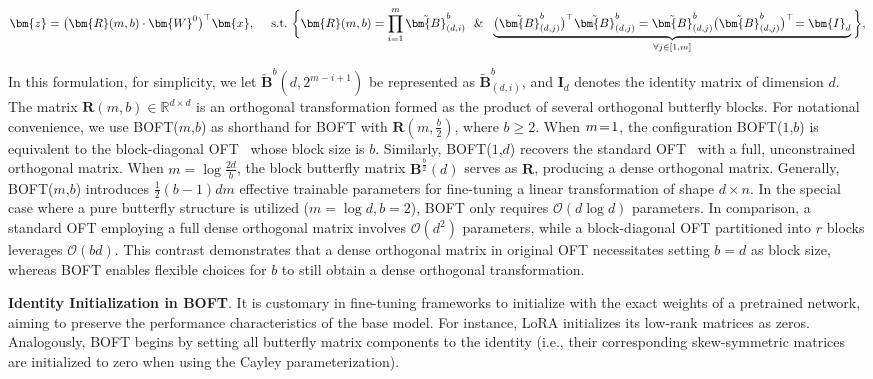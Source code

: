 \begin{equation}
    \begin{aligned}\nonumber
    \bm{z}=\big(\bm{R}(m,b)\cdot\bm{W}^0\big)^\top\bm{x},~~~~\text{s.t.}~\bigg{\{}\bm{R}(m,b)=\prod_{i=1}^m \tilde{\bm{B}}^b_{(d,i)}~~\&~~\underbrace{\big(\tilde{\bm{B}}^b_{(d,j)}\big)^\top\tilde{\bm{B}}^b_{(d,j)}=\tilde{\bm{B}}^b_{(d,j)}\big(\tilde{\bm{B}}^b_{(d,j)}\big)^\top\!=\bm{I}_d}_{\forall j\in [1, m]}\bigg{\}},
    \end{aligned}
\end{equation}

In this formulation, for simplicity, we let $\tilde{\bm{B}}^b(d,2^{m - i+1})$ be represented as $\tilde{\bm{B}}^b_{(d,i)}$, and $\bm{I}_d$ denotes the identity matrix of dimension $d$. The matrix $\bm{R}(m,b)\in\mathbb{R}^{d\times d}$ is an orthogonal transformation formed as the product of several orthogonal butterfly blocks. For notational convenience, we use BOFT($m$,$b$) as shorthand for BOFT with $\bm{R}(m,\frac{b}{2})$, where $b\geq 2$. When $\thickmuskip=2mu \medmuskip=2mu m=1$, the configuration BOFT($1$,$b$) is equivalent to the block-diagonal OFT~\cite{qiu2023controlling} whose block size is $b$. Similarly, BOFT($1$,$d$) recovers the standard OFT~\cite{qiu2023controlling} with a full, unconstrained orthogonal matrix. When $m=\log \frac{2d}{b}$, the block butterfly matrix $\bm{B}^{\frac{b}{2}}(d)$ serves as $\bm{R}$, producing a dense orthogonal matrix. Generally, BOFT($m$,$b$) introduces $\frac{1}{2}(b-1)dm$ effective trainable parameters for fine-tuning a linear transformation of shape $d\times n$. In the special case where a pure butterfly structure is utilized ($m=\log d, b=2$), BOFT only requires $\mathcal{O}(d\log d)$ parameters. In comparison, a standard OFT employing a full dense orthogonal matrix involves $\mathcal{O}(d^2)$ parameters, while a block-diagonal OFT partitioned into $r$ blocks leverages $\mathcal{O}(bd)$. This contrast demonstrates that a dense orthogonal matrix in original OFT necessitates setting $b=d$ as block size, whereas BOFT enables flexible choices for $b$ to still obtain a dense orthogonal transformation.

\textbf{Identity Initialization in BOFT}. It is customary in fine-tuning frameworks to initialize with the exact weights of a pretrained network, aiming to preserve the performance characteristics of the base model. For instance, LoRA initializes its low-rank matrices as zeros. Analogously, BOFT begins by setting all butterfly matrix components to the identity (i.e., their corresponding skew-symmetric matrices are initialized to zero when using the Cayley parameterization).

